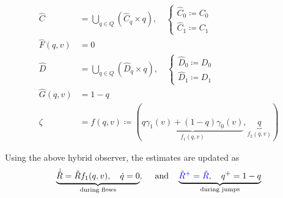 \documentclass{article}
\newcommand{\brackets}[1]{\left(#1\right)}
\newcommand{\textblue}[1]{\textcolor{blue}{#1}}
\begin{document}
\begin{subequations}
\begin{align}
    \hat{C} &= \bigcup_{q\in Q}\brackets{\hat{C}_{q}\times q}, \quad \begin{cases}
        \hat{C}_{0} \coloneqq C_0\\
        \hat{C}_{1} \coloneqq C_1
    \end{cases}\\
    \hat{F}(q, v) &= 0\\
    \hat{D} &= \bigcup_{q\in Q} \brackets{\hat{D}_{q}\times q}, \quad \begin{cases}
        \hat{D}_{0} \coloneqq D_0\\
        \hat{D}_{1} \coloneqq D_1
    \end{cases}\\
    \hat{G}(q, v) &= 1 - q \\
    \zeta &= f(q,v)\coloneqq (\underbrace{q\gamma_1(v) + (1-q)\gamma_0(v)}_\text{$f_1(q, v)$}, \underbrace{q}_\text{$f_2(q,v)$}) \label{eq:output_hybrid}
\end{align}
\end{subequations}



Using the above hybrid observer, the estimates are updated as 
\begin{align} \label{eq:observer_final}
\underbrace{\dot{\hat{R}} = \hat{R} f_1(q, v), \quad \dot{q} = 0}_{\text{during flows}}, \quad \text{ and}\quad  \underbrace{\textblue{\hat{R}^+ = \hat{R}}, \quad q^+ = 1 - q}_\text{during jumps}
\end{align}
\end{document}

